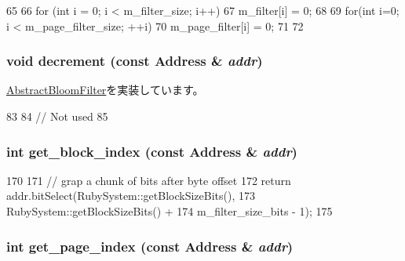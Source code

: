 \begin{DoxyCode}
65 {
66     for (int i = 0; i < m_filter_size; i++) {
67         m_filter[i] = 0;
68     }
69     for(int i=0; i < m_page_filter_size; ++i){
70         m_page_filter[i] = 0;
71     }
72 }
\end{DoxyCode}
\hypertarget{classMultiGrainBloomFilter_addb6b805abb8328082a24926f2bf8c84}{
\subsubsection[{decrement}]{\setlength{\rightskip}{0pt plus 5cm}void decrement (const {\bf Address} \& {\em addr})}}
\label{classMultiGrainBloomFilter_addb6b805abb8328082a24926f2bf8c84}


\hyperlink{classAbstractBloomFilter_aa387151f4ab03c6cd497d4385e34c21a}{AbstractBloomFilter}を実装しています。


\begin{DoxyCode}
83 {
84     // Not used
85 }
\end{DoxyCode}
\hypertarget{classMultiGrainBloomFilter_ab51932d43eaff65d567ef66e7cb780a7}{
\subsubsection[{get\_\-block\_\-index}]{\setlength{\rightskip}{0pt plus 5cm}int get\_\-block\_\-index (const {\bf Address} \& {\em addr})}}
\label{classMultiGrainBloomFilter_ab51932d43eaff65d567ef66e7cb780a7}



\begin{DoxyCode}
170 {
171     // grap a chunk of bits after byte offset
172     return addr.bitSelect(RubySystem::getBlockSizeBits(),
173                           RubySystem::getBlockSizeBits() +
174                           m_filter_size_bits - 1);
175 }
\end{DoxyCode}
\hypertarget{classMultiGrainBloomFilter_afe2bb7b363c084edcbfec4a359a3dd12}{
\subsubsection[{get\_\-page\_\-index}]{\setlength{\rightskip}{0pt plus 5cm}int get\_\-page\_\-index (const {\bf Address} \& {\em addr})}}
\label{classMultiGrainBloomFilter_afe2bb7b363c084edcbfec4a359a3dd12}



